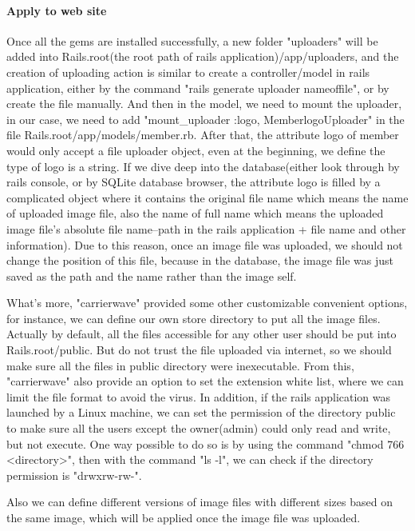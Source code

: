 \begin{enumerate}
\begin{itemize}
\paragraph{Apply to web site}
Once all the gems are installed successfully, a new folder "uploaders" will be added into Rails.root(the root path of rails application)/app/uploaders, and the creation of uploading action is similar to create a controller/model in rails application, either by the command "rails generate uploader nameoffile", or by create the file manually. And then in the model, we need to mount the uploader, in our case, we need to add  "mount\_uploader :logo, MemberlogoUploader" in the file Rails.root/app/models/member.rb. After that, the attribute logo of member would only accept a file uploader object, even at the beginning, we define the type of logo is a string. If we dive deep into the database(either look through by rails console, or by SQLite database browser, the attribute logo is filled by a complicated object where it contains the original file name which means the name of uploaded image file, also the name of full name which means the uploaded image file's absolute file name--path in the rails application + file name and other information). Due to this reason, once an image file was uploaded, we should not change the position of this file, because in the database, the image file was just saved as the path and the name rather than the image self.


What's more, "carrierwave" provided some other customizable convenient options, for instance, we can define our own store directory to put all the image files. Actually by default, all the files accessible for any other user should be put into Rails.root/public. But do not trust the file uploaded via internet, so we should make sure all the files in public directory were inexecutable. From this, "carrierwave" also provide an option to set the extension white list, where we can limit the file format to avoid the virus. In addition, if the rails application was launched by a Linux machine, we can set the permission of the directory public to make sure all the users except the owner(admin) could only read and write, but not execute. One way possible to do so is by using the command "chmod 766 <directory>", then with the command "ls -l", we can check if the directory permission is
"drwxrw-rw-".

Also we can define different versions of image files with different sizes based on the same image, which will be applied once the image file was uploaded.


\end{itemize}
\end{enumerate}
